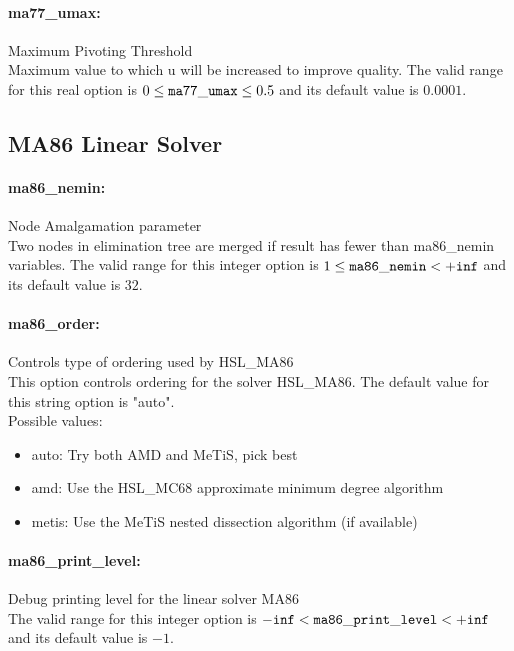 \paragraph{ma77\_umax:}\label{opt:ma77_umax} Maximum Pivoting Threshold \\
 Maximum value to which u will be increased to improve quality. The valid range for this real option is 
$0 \le {\tt ma77\_umax } \le 0.5$
and its default value is $0.0001$.


\subsection{MA86 Linear Solver}
\label{sec:MA86LinearSolver}
\paragraph{ma86\_nemin:}\label{opt:ma86_nemin} Node Amalgamation parameter \\
 Two nodes in elimination tree are merged if result has fewer than ma86\_nemin variables. The valid range for this integer option is
$1 \le {\tt ma86\_nemin } <  {\tt +inf}$
and its default value is $32$.


\paragraph{ma86\_order:}\label{opt:ma86_order} Controls type of ordering used by HSL\_MA86 \\
 This option controls ordering for the solver HSL\_MA86. The default value for this string option is "auto".
\\ 
Possible values:
\begin{itemize}
   \item auto: Try both AMD and MeTiS, pick best
   \item amd: Use the HSL\_MC68 approximate minimum degree algorithm
   \item metis: Use the MeTiS nested dissection algorithm (if available)
\end{itemize}

\paragraph{ma86\_print\_level:}\label{opt:ma86_print_level} Debug printing level for the linear solver MA86 \\
 The valid range for this integer option is
${\tt -inf} <  {\tt ma86\_print\_level } <  {\tt +inf}$
and its default value is $-1$.


